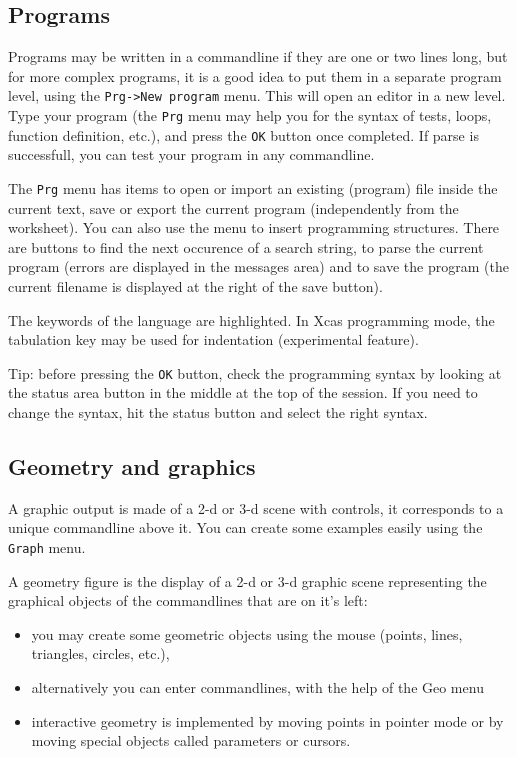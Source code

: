 \documentclass{article}
\begin{document}
\subsection{Programs}
Programs may be written in a commandline if they are one or two
lines long, but for more complex programs, it is a good idea to
put them in a separate program level, using the
\verb|Prg->New program| menu. This will open an editor in
a new level. Type your program (the {\tt Prg} menu may help you
for the syntax of tests, loops, function definition, etc.), 
and press the {\tt OK} button once completed. 
If parse is successfull, you can test your program
in any commandline.

The \verb|Prg| menu has items to open or
import an existing (program) file inside the current text, save
or export the current program (independently from the worksheet). 
You can also use the menu 
to insert programming structures. There are buttons to find the
next occurence of a search string, to parse the current program
(errors are displayed in the messages area) and to save the
program (the current filename is displayed at the right of the
save button).

The keywords of the language are highlighted. In Xcas programming
mode, the tabulation key may be used for indentation (experimental
feature).

Tip: before pressing the {\tt OK} button, check the programming
syntax by looking at the status area button
in the middle at the top of the session. If you need
to change the syntax, hit the status button and select the right syntax.

\subsection{Geometry and graphics}
A graphic output is made of a 2-d or 3-d scene with controls,
it corresponds to a unique commandline above it. 
You can create some examples easily using the {\tt Graph} menu.

A geometry figure is the display of a 2-d or 3-d graphic scene 
representing the graphical objects of the commandlines 
that are on it's left:
\begin{itemize}
\item you may create some geometric objects using the mouse (points,
lines, triangles, circles, etc.),
\item alternatively you can enter commandlines, with the help
of the Geo menu
\item
interactive geometry is implemented by moving points in pointer
mode or by moving special objects called parameters or cursors. 
\end{itemize}
\end{document}
